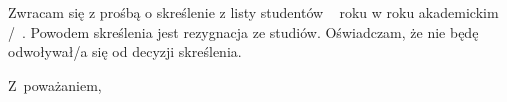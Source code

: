 \documentclass{wmiisubmission}
\begin{document}
\cracowdate
{}
\studentaddress
\addressee{\piotrniemiec}

\vskip 3.0cm


\vskip 0.5cm

Zwracam się z prośbą o skreślenie z listy studentów \fillField{2cm}~ roku w roku
akademickim \fillField{1cm}/\fillField{1cm}~. Powodem skreślenia jest rezygnacja
ze studiów.
Oświadczam, że nie będę odwoływał/a się od decyzji skreślenia.

\vskip 2.0cm

\hspace{\fill} Z~poważaniem, \hspace{2.0cm}
\vskip 4.0cm

\end{document}
